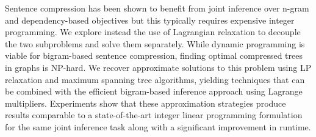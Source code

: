 Sentence compression has been shown to benefit from joint inference over n-gram and dependency-based objectives but this typically requires expensive integer programming. We explore instead the use of Lagrangian relaxation to decouple the two subproblems and solve them separately. While dynamic programming is viable for bigram-based sentence compression, finding optimal compressed trees in graphs is NP-hard. We recover approximate solutions to this problem using LP relaxation and maximum spanning tree algorithms, yielding techniques that can be combined with the efficient bigram-based inference approach using Lagrange multipliers. Experiments show that these approximation strategies produce results comparable to a state-of-the-art integer linear programming formulation for the same joint inference task along with a significant improvement in runtime.
